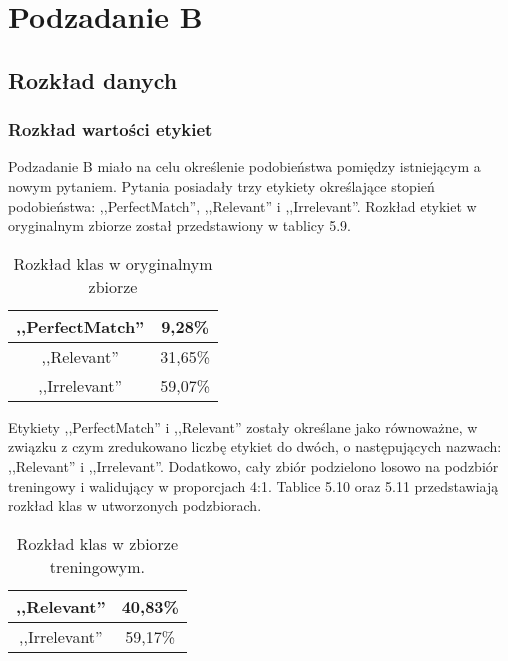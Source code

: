 \section{Podzadanie B}
\subsection{Rozkład danych}
\subsubsection{Rozkład wartości etykiet}

Podzadanie B miało na celu określenie podobieństwa pomiędzy istniejącym a nowym pytaniem. Pytania posiadały trzy etykiety określające stopień podobieństwa: ,,PerfectMatch'', ,,Relevant'' i ,,Irrelevant''. Rozkład etykiet w oryginalnym zbiorze został przedstawiony w tablicy 5.9.

\begin{table}[H]
\caption{Rozkład klas w oryginalnym zbiorze}
\label{subtask_b_original_set_statistics_score_table}
    \begin{center}
        \begin{tabular}{ |c|c| } 
            \hline
            ,,PerfectMatch'' & 9,28\% \\
            \hline
            ,,Relevant'' & 31,65\% \\
            \hline
            ,,Irrelevant'' & 59,07\% \\ 
            \hline
        \end{tabular}
    \end{center}
\end{table}

Etykiety ,,PerfectMatch'' i ,,Relevant'' zostały określane jako równoważne, w związku z czym zredukowano liczbę etykiet do dwóch, o następujących nazwach: ,,Relevant'' i ,,Irrelevant''. Dodatkowo, cały zbiór podzielono losowo na podzbiór treningowy i walidujący w proporcjach 4:1. Tablice 5.10 oraz 5.11 przedstawiają rozkład klas w utworzonych podzbiorach.

\begin{table}[H]
\caption{Rozkład klas w zbiorze treningowym.}
\label{subtask_b_train_set_statistics_score_table}
    \begin{center}
        \begin{tabular}{ |c|c| } 
            \hline
            ,,Relevant'' & 40,83\% \\
            \hline
            ,,Irrelevant'' & 59,17\% \\ 
            \hline
        \end{tabular}
    \end{center}
\end{table}

